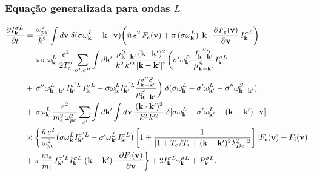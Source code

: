 \documentclass[10pt,aspectratio=1610,lualatex]{beamer}
\begin{document}
\begin{frame}
  \frametitle{Equação generalizada para ondas $L$}
  \begin{equation*}
    \begin{split}
      \frac{\partial I_{\bf k}^{\sigma L}}{\partial t}
      &=\frac{\omega_{pe}^2}{k^2}\int d{\bf v}\;
      \delta(\sigma\omega_{\bf k}^L-{\bf k}\cdot{\bf v})
      \biggl(\hat{n}\,e^2\,F_e({\bf v})
      +\pi\,(\sigma\omega_{\bf k}^L)\, \;{\bf k}\cdot
      \frac{\partial F_e({\bf v})}{\partial{\bf v}}\,
      I_{\bf k}^{\sigma L}\biggr)\\
      &-\,\pi\sigma\,\omega_{\bf k}^L
      \,\frac{e^2}{2T_e^2}\sum_{\sigma ',\sigma ''}\int d{\bf k'}\;
      \frac{\mu_{{\bf k}-{\bf k}'}^S \,({\bf k}
	\cdot{\bf k}')^2}{k^2\,k'^2\,|{\bf k}-{\bf k}'|^2}
      \biggl(\sigma '\omega_{{\bf k}'}^L\,
      \frac{I_{{\bf k}-{\bf k}'}^{\sigma ''S}}{\mu_{{\bf k}-{\bf k}'}^S}
      I_{\bf k}^{\sigma L}\\
      &+\,\sigma ''\omega_{{\bf k}-{\bf k}'}^L \,I_{{\bf k}'}^{\sigma 'L}\,
      I_{\bf k}^{\sigma L} -\sigma\omega_{\bf k}^L I_{{\bf k}'}^{\sigma 'L}
      \frac{I_{{\bf k}-{\bf k}'}^{\sigma ''S}}{\mu_{{\bf k}-{\bf k}'}^S}
      \biggr)\;\delta(\sigma\omega_{\bf k}^L-\sigma '\omega_{{\bf k}'}^L
      -\sigma ''\omega_{{\bf k}-{\bf k}'}^S)\\
      &+\,\sigma\omega_{\bf k}^L\,\frac{e^2}{m_e^2\,\omega_{pe}^2}
      \sum_{\sigma '}\int d{\bf k'}\int d{\bf v}\;
      \frac{({\bf k}\cdot{\bf k}')^2}{k^2\,k'^2}\;
      \delta[\sigma\omega_{\bf k}^L-\sigma '\omega_{{\bf k}'}^L
      -({\bf k}-{\bf k}')\cdot{\bf v}]\\
      &\times\biggl\{\frac{\hat{n}\,e^2}{\omega_{pe}^2}
      \bigl(\sigma\omega_{\bf k}^LI_{{\bf k}'}^{\sigma 'L}
      -\sigma ' \omega_{{\bf k}'}^L I_{\bf k}^{\sigma L}\bigr)
      \left[1+ \frac{1}{|1+T_e/T_i+({\bf k-k'})^2 \lambda_{De}^2|^2}
      \right] [F_e({\bf v})+F_i({\bf v})]\\
      &+\pi\,\frac{m_e}{m_i}\,I_{{\bf k}'}^{\sigma 'L}
      I_{\bf k}^{\sigma L}\;({\bf k}-{\bf k}')
      \cdot\frac{\partial F_i({\bf v})}{\partial{\bf v}}\biggr\}
      +2 I_{\bf k}^{\sigma L} \gamma_{\bf k}^{\sigma L}+ P_{\bf k}^{\sigma L}.
    \end{split}
  \end{equation*}
\end{frame}
\end{document}
